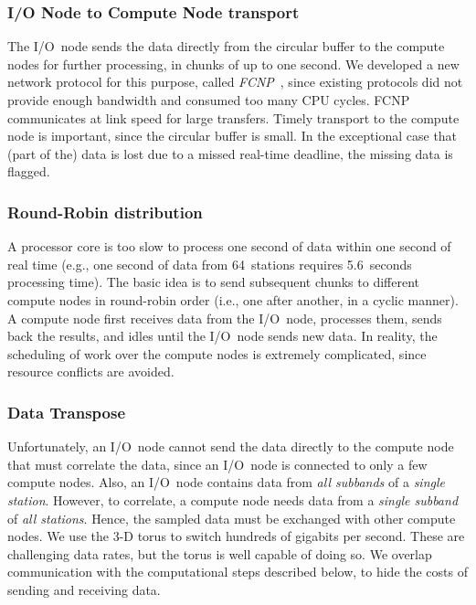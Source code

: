\subsubsection{I/O Node to Compute Node transport}

The I/O~node sends the data directly from the circular buffer to the compute
nodes for further processing, in chunks of up to one second.
We developed a new network protocol for this purpose, called
\emph{FCNP\/}~\cite{Romein:09a}, since existing protocols did not provide
enough bandwidth and consumed too many CPU cycles.
FCNP communicates at link speed for large transfers.
Timely transport to the compute node is important, since the circular buffer
is small.
In the exceptional case that (part of the) data is lost due to a missed
real-time deadline, the missing data is flagged.


\subsubsection{Round-Robin distribution}

A processor core is too slow to process one second of data within one second of
real time (e.g., one second of data from 64~stations requires 5.6~seconds
processing time).
The basic idea is to send subsequent chunks to different compute nodes in
round-robin order (i.e., one after another, in a cyclic manner).
A compute node first receives data from the I/O~node, processes them, sends
back the results, and idles until the I/O~node sends new data.
In reality, the scheduling of work over the compute nodes is extremely
complicated, since resource conflicts are avoided.


\subsubsection{Data Transpose}

Unfortunately, an I/O~node cannot send the data directly to the compute node
that must correlate the data, since an I/O~node is connected to only a few
compute nodes.
Also, an I/O~node contains data from \emph{all subbands\/} of a \emph{single
station}.
However, to correlate, a compute node needs data from a \emph{single subband\/}
of \emph{all stations}.
Hence, the sampled data must be exchanged with other compute nodes.
We use the 3-D torus to switch hundreds of gigabits per second.
These are challenging data rates, but the torus is well capable of doing so.
We overlap communication with the computational steps described below,
to hide the costs of sending and receiving data.


